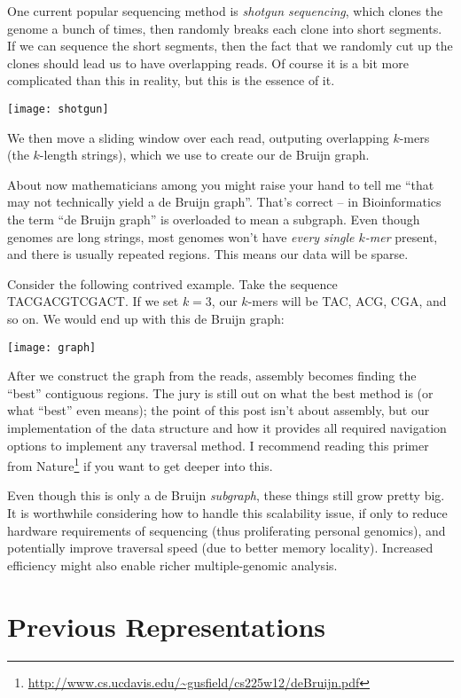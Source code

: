 One current popular sequencing method is \emph{shotgun sequencing}, which clones the genome a bunch of times, then randomly breaks each clone into short segments. If we can sequence the short segments, then the fact that we randomly cut up the clones should lead us to have overlapping reads. Of course it is a bit more complicated than this in reality, but this is the essence of it.

\medskip\centerline{\texttt{[image: shotgun]}}\medskip

We then move a sliding window over each read, outputing overlapping $k$-mers (the $k$-length strings), which we use to create our de Bruijn graph.

About now mathematicians among you might raise your hand to tell me ``that may not technically yield a de Bruijn graph''. That's correct -- in Bioinformatics the term ``de Bruijn graph'' is overloaded to mean a subgraph. Even though genomes are long strings, most genomes won't have \emph{every single $k$-mer} present, and there is usually repeated regions. This means our data will be sparse.

Consider the following contrived example. Take the sequence TACGACGTCGACT. If we set $k=3$, our $k$-mers will be TAC, ACG, CGA, and so on. We would end up with this de Bruijn graph:

\medskip\centerline{\texttt{[image: graph]}}\medskip

After we construct the graph from the reads, assembly becomes finding the ``best'' contiguous regions. The jury is still out on what the best method is (or what ``best'' even means); the point of this post isn't about assembly, but our implementation of the data structure and how it provides all required navigation options to implement any traversal method. I recommend reading this primer from Nature\footnote{\url{http://www.cs.ucdavis.edu/~gusfield/cs225w12/deBruijn.pdf}} if you want to get deeper into this.

Even though this is only a de Bruijn \emph{subgraph}, these things still grow pretty big. It is worthwhile considering how to handle this scalability issue, if only to reduce hardware requirements of sequencing (thus proliferating personal genomics), and potentially improve traversal speed (due to better memory locality). Increased efficiency might also enable richer multiple-genomic analysis.

\section{Previous Representations}\label{bl-sec:pre}

